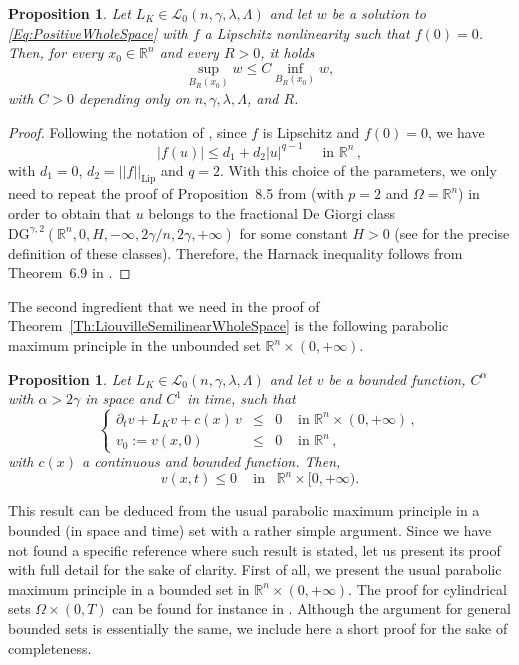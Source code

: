 \documentclass[12pt,reqno]{amsart}
\newtheorem{proposition}[theorem]{Proposition}
\theoremstyle{definition}
\theoremstyle{remark}
\newcommand{\con}[1]{\mathbb{#1}}
\newcommand{\R}{\con{R}} %
\newcommand{\lcal}{\mathcal{L}}
\newcommand{\s}{\gamma}
\newcommand\beqc[1]{\left\{\begin{array}{#1}}
\newcommand\eeqc{\end{array} \right.}
\def\PDEsystem{rcll}
\numberwithin{equation}{section}
\begin{document}
\begin{proposition}
	\label{Prop:HarnackSemilinear}
	Let $L_K\in\mathcal{L}_0(n,\s,\lambda,\Lambda)$ and let $w$ be a solution to \eqref{Eq:PositiveWholeSpace} with $f$ a Lipschitz nonlinearity such that $f(0) = 0$. Then, for every $x_0 \in \R^n$ and every $R>0$, it holds
	$$
	\sup_{B_R(x_0)} w \leq C  \inf_{B_R(x_0)} w, 
	$$
	with $C>0$  depending only on $n,\s,\lambda,\Lambda$, and $R$.
\end{proposition}

\begin{proof}
	Following the notation of \cite{Cozzi-DeGiorgiClassesLong}, since $f$ is Lipschitz and $f(0) = 0$, we have
	$$
	|f(u)|\leq d_1 + d_2 |u|^{q-1} \quad \text{ in } \R^n\,,
	$$ 
	with $d_1=0$, $d_2 =||f||_{\mathrm{Lip}}$ and $q=2$. With this choice of the parameters, we only need to repeat the proof of Proposition~8.5 from \cite{Cozzi-DeGiorgiClassesLong} (with $p=2$ and $\Omega = \R^n$) in order to obtain that $u$ belongs to the fractional De Giorgi class $\mathrm{DG}^{\s,2} ( \R^n , 0, H, -\infty,2\s/n,2\s,+\infty)$	for some constant $H>0$ (see \cite{Cozzi-DeGiorgiClassesLong} for the precise definition of these classes). Therefore, the Harnack inequality follows from Theorem~6.9 in \cite{Cozzi-DeGiorgiClassesLong}.
\end{proof}


The second ingredient that we need in the proof of Theorem~\ref{Th:LiouvilleSemilinearWholeSpace} is the following parabolic maximum principle in the unbounded set $\R^n \times (0,+\infty)$. 

\begin{proposition}
	\label{Prop:ParaMaxPrp}
	Let $L_K \in \lcal_0(n,\s,\lambda, \Lambda)$ and let $v$ be a bounded function, $C^\alpha$ with $\alpha > 2\s$ in space and $C^1$ in time, such that
	\begin{equation*}
	\beqc{\PDEsystem}
	\partial_t v + L_K  v + c(x)\,v &\leq& 0 & \textrm{ in }\R^n\times(0,+\infty)\,,\\
	v_0:=v(x,0) &\leq& 0 & \textrm{ in } \R^n\,,
	\eeqc
	\end{equation*}
	with $c(x)$ a continuous and bounded function. Then,
	$$ v(x,t) \leq 0 \,\,\,\,\,\text{ in } \,\,\, \R^n\times[0,+\infty). $$
\end{proposition}

This result can be deduced from the usual parabolic maximum principle in a bounded (in space and time) set with a rather simple argument. Since we have not found a specific reference where such result is stated, let us present its proof with full detail for the sake of clarity. First of all, we present the usual parabolic maximum principle in a bounded set in $\R^n \times (0,+\infty)$. The proof for cylindrical sets $\Omega \times (0,T)$ can be found for instance in \cite{BarriosPeralSoriaValdinoci}. Although the argument for general bounded sets is essentially the same,  we include here a short proof for the sake of completeness.
\end{document}
